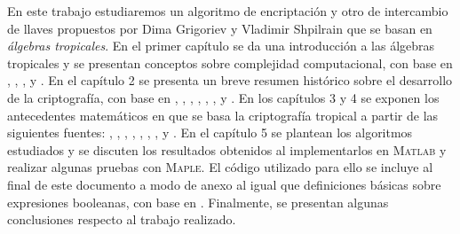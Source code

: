 \bigskip En este trabajo estudiaremos un algoritmo de encriptación y otro de intercambio de llaves propuestos por Dima Grigoriev y Vladimir Shpilrain \cite{art} que se basan en \textit{álgebras tropicales}. En el primer capítulo se da una introducción a las álgebras tropicales y se presentan conceptos sobre complejidad computacional, con base en \cite{cravioto}, \cite{diane}, \cite{mik}, \cite{strum} y \cite{app}. En el capítulo 2 se presenta un breve resumen histórico sobre el desarrollo de la criptografía, con base en \cite{rsa}, \cite{fraleigh}, \cite{kahn}, \cite{des}, \cite{artescit}, \cite{criptolibro}, \cite{kasiski} y \cite{sueto}. En los capítulos 3 y 4 se exponen los antecedentes matemáticos en que se basa la criptografía tropical a partir de las siguientes fuentes: \cite{maxls}, \cite{cook}, \cite{art}, \cite{mult}, \cite{quant}, \cite{diane}, \cite{mik}, \cite{strum} y \cite{stick}. En el capítulo 5 se plantean los algoritmos estudiados y se discuten los resultados obtenidos al implementarlos en \textsc{Matlab} y realizar algunas pruebas con \textsc{Maple}. El código utilizado para ello se incluye al final de este documento a modo de anexo al igual que definiciones básicas sobre expresiones booleanas, con base en \cite{cravioto}. Finalmente, se presentan algunas conclusiones respecto al trabajo realizado.



